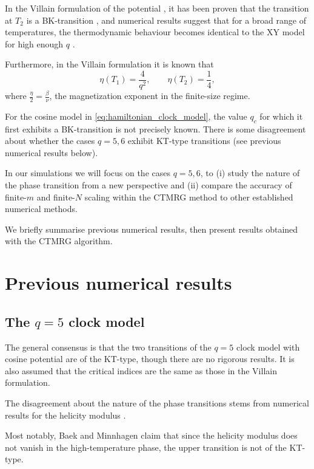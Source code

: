 In the Villain formulation of the potential \cite{villain1975theory}, it has been proven that the transition at $T_2$ is
a BK-transition \cite{jose1977renormalization}, and numerical results suggest that for a broad range of temperatures,
the thermodynamic behaviour becomes identical to the XY model for high enough $q$ \cite{lapilli2006universality}.

Furthermore, in the Villain formulation it is known that \cite{elitzur1979phase, nienhuis1984critical}
\begin{equation}\label{eq:eta_villain}
  \eta(T_1) =\frac{4}{q^2}, \qquad \eta(T_2) = \frac{1}{4},
\end{equation}
where $\frac{\eta}{2} = \frac{\beta}{\nu}$, the magnetization exponent in the finite-size regime.

For the cosine model in \autoref{eq:hamiltonian_clock_model}, the value $q_c$ for which it first exhibits a
BK-transition is not precisely known.
There is some disagreement about whether the cases $q = 5, 6$ exhibit KT-type transitions (see previous numerical
results below).

In our simulations we will focus on the cases $q = 5, 6$, to (i) study the nature of the phase transition from a new
perspective and (ii) compare the accuracy of finite-$m$ and finite-$N$ scaling within the CTMRG
method to other established numerical methods.

We briefly summarise previous numerical results, then present results obtained with the CTMRG algorithm.

\section{Previous numerical results}
\subsection{The $q = 5$ clock model}

The general consensus is that the two transitions of the $q = 5$ clock model with cosine potential are of the KT-type,
though there are no rigorous results.
It is also assumed that the critical indices are the same as those in the Villain formulation.

The disagreement about the nature of the phase transitions
stems from numerical results for the helicity modulus
\cite{fisher1973helicity}.

Most notably, Baek and Minnhagen \cite{baek2010non} claim that since the helicity modulus does
not vanish in the high-temperature phase, the upper transition is not of the KT-type.

